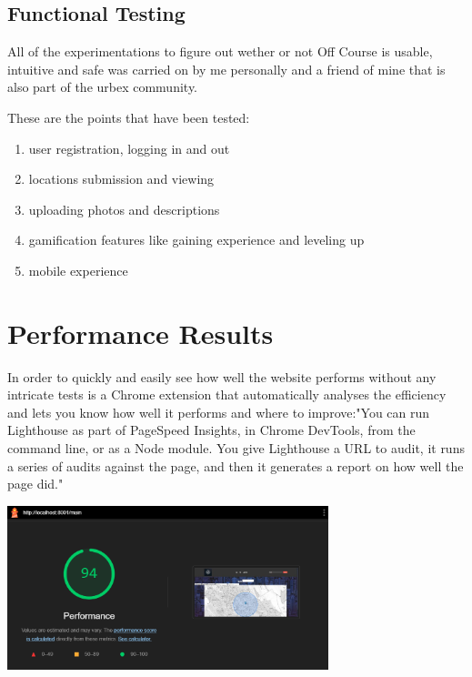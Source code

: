 \documentclass[12pt,a4paper]{report}
\begin{document}
\subsection{Functional Testing}

All of the experimentations to figure out wether or not Off Course is usable, intuitive and safe was carried on by me personally and a friend of mine that is also part of the urbex community.

These are the points that have been tested:

\begin{enumerate}
    \item user registration, logging in and out
    \item locations submission and viewing
    \item uploading photos and descriptions
    \item gamification features like gaining experience and leveling up
    \item mobile experience
\end{enumerate}

\section{Performance Results}

In order to quickly and easily see how well the website performs without any intricate tests is a Chrome extension that automatically analyses the efficiency and lets you know how well it performs and where to improve:"You can run Lighthouse as part of PageSpeed Insights, in Chrome DevTools, from the command line, or as a Node module. You give Lighthouse a URL to audit, it runs a series of audits against the page, and then it generates a report on how well the page did."~\cite{lighthouseChrome}

\begin{center}
\includegraphics[width=0.7\textwidth]{images/lighthouse.png}
\end{center}
\end{document}
